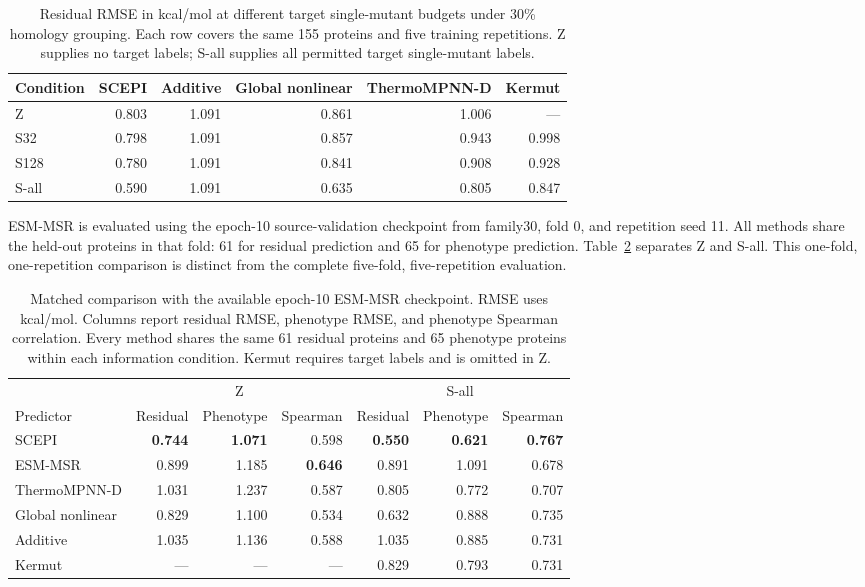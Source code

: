 \documentclass{llncs}
\begin{document}
\begin{table}[H]
\centering
\caption{Residual RMSE in kcal/mol at different target single-mutant budgets under 30\% homology grouping. Each row covers the same 155 proteins and five training repetitions. Z supplies no target labels; S-all supplies all permitted target single-mutant labels.}
\label{tab:singlebudgets}
\begin{tabular}{lrrrrr}
\toprule
Condition & SCEPI & Additive & Global nonlinear & ThermoMPNN-D & Kermut \\
\midrule
Z & 0.803 & 1.091 & 0.861 & 1.006 & --- \\
S32 & 0.798 & 1.091 & 0.857 & 0.943 & 0.998 \\
S128 & 0.780 & 1.091 & 0.841 & 0.908 & 0.928 \\
S-all & 0.590 & 1.091 & 0.635 & 0.805 & 0.847 \\
\bottomrule
\end{tabular}
\end{table}

ESM-MSR is evaluated using the epoch-10 source-validation checkpoint from family30, fold 0, and repetition seed 11. All methods share the held-out proteins in that fold: 61 for residual prediction and 65 for phenotype prediction. Table~\ref{tab:msrsubset} separates Z and S-all. This one-fold, one-repetition comparison is distinct from the complete five-fold, five-repetition evaluation.

\begin{table}[H]
\centering
\setlength{\tabcolsep}{4pt}
\caption{Matched comparison with the available epoch-10 ESM-MSR checkpoint. RMSE uses kcal/mol. Columns report residual RMSE, phenotype RMSE, and phenotype Spearman correlation. Every method shares the same 61 residual proteins and 65 phenotype proteins within each information condition. Kermut requires target labels and is omitted in Z.}
\label{tab:msrsubset}
\begin{tabular}{lrrrrrr}
\toprule
 & \multicolumn{3}{c}{Z} & \multicolumn{3}{c}{S-all} \\
\cmidrule(lr){2-4}\cmidrule(lr){5-7}
Predictor & Residual & Phenotype & Spearman & Residual & Phenotype & Spearman \\
\midrule
SCEPI & \textbf{0.744} & \textbf{1.071} & 0.598 & \textbf{0.550} & \textbf{0.621} & \textbf{0.767} \\
ESM-MSR & 0.899 & 1.185 & \textbf{0.646} & 0.891 & 1.091 & 0.678 \\
ThermoMPNN-D & 1.031 & 1.237 & 0.587 & 0.805 & 0.772 & 0.707 \\
Global nonlinear & 0.829 & 1.100 & 0.534 & 0.632 & 0.888 & 0.735 \\
Additive & 1.035 & 1.136 & 0.588 & 1.035 & 0.885 & 0.731 \\
Kermut & --- & --- & --- & 0.829 & 0.793 & 0.731 \\
\bottomrule
\end{tabular}
\end{table}
\end{document}

